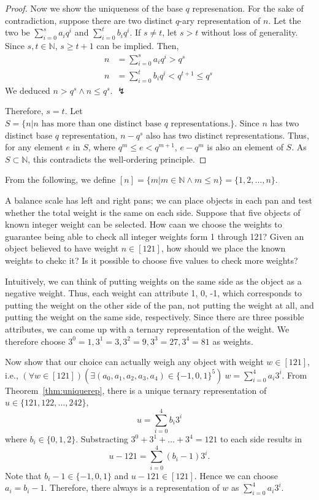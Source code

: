 \documentclass[../main.tex]{subfiles}
\begin{document}
\begin{proof}
    Now we show the uniqueness of the base $q$ represenation.
    For the sake of contradiction, suppose there are two distinct $q$-ary representation of $n$.
    Let the two be $\sum_{i = 0}^s a_i q^i$ and $\sum_{i = 0}^t b_i q^i$.
    If $s \neq t$, let $s > t$ without loss of generality.
    Since $s, t \in \mathbb N$, $s \geq t+1$ can be implied.
    Then,
    \begin{align*}
        n &= \sum_{i=0}^s a_i q^i > q^s\\
        n &= \sum_{i=0}^t b_i q^i < q^{t+1} \leq q^s \
    \end{align*}
    We deduced $n > q^s \wedge n \leq q^s$. $\lightning$

    Therefore, $s = t$.
    Let $S = \{n | n \text{ has more than one distinct base $q$ representations.}\}$.
    Since $n$ has two distinct base $q$ representation, $n - q^s$ also has two distinct representations.
    Thus, for any element $e$ in $S$, where $q^m \leq e < q^{m+1}$, $e - q^m$ is also an element of $S$.
    As $S \subset \mathbb N$, this contradicts the well-ordering principle.
\end{proof}

From the following, we define $[n] = \{m | m \in \mathbb{N} \wedge m \leq n\} = \{1, 2, \dots, n\}$.

\begin{prob} 
    A balance scale has left and right pans; we can place objects in each pan and test whether the total weight is the same on each side.
    Suppose that five objects of known integer weight can be selected.
    How caan we choose the weights to guarantee being able to check all integer weights form 1 through 121?
    Given an object believed to have weight $n \in [121]$, how should we place the known weights to chekc it?
    Is it possible to choose five values to check more weights?
\end{prob}
\begin{sol}
    Intuitively, we can think of putting weights on the same side as the object as a negative weight.
    Thus, each weight can attribute 1, 0, -1, which corresponds to putting the weight on the other side of the pan, not putting the weight at all, and putting the weight on the same side, respectively.
    Since there are three possible attributes, we can come up with a ternary representation of the weight.
    We therefore choose $3^0=1, 3^1=3, 3^2=9, 3^3=27, 3^4=81$ as weights.

    Now show that our choice can actually weigh any object with weight $w \in [121]$, i.e., $(\forall w \in [121])(\exists (a_0, a_1, a_2, a_3, a_4) \in \{-1, 0, 1\}^5)\ w = \sum_{i = 0}^4 a_i 3^i$.
    From Theorem~\ref{thm:uniquerep}, there is a unique ternary representation of $u \in \{121, 122, \dots, 242\}$,
    \[
        u = \sum_{i = 0}^4 b_i 3^i
    \]
    where $b_i \in \{0, 1, 2\}$.
    Substracting $3^0 + 3^1 + \dots + 3^4 = 121$ to each side results in
    \[
        u - 121 = \sum_{i = 0}^4 (b_i - 1) 3^i.
    \]
    Note that $b_i - 1 \in \{-1, 0, 1\}$ and $u - 121 \in [121]$.
    Hence we can choose $a_i = b_i - 1$.
    Therefore, there always is a representation of $w$ as $\sum_{i=0}^4 a_i 3^i$.
\end{sol}
\end{document}
